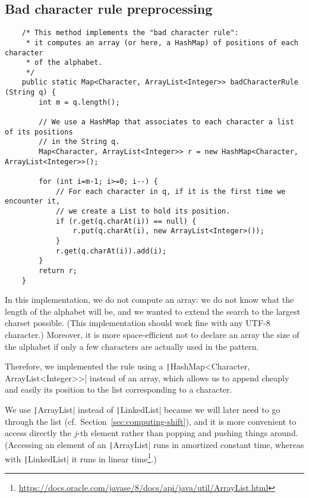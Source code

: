 \documentclass[a4paper,11pt,openany,extrafontsizes,twoside,article]{memoir}
\begin{document}
\subsection{Bad character rule preprocessing}
\label{sec:bad-character-rule-1}

\begin{verbatim}
    /* This method implements the "bad character rule":
     * it computes an array (or here, a HashMap) of positions of each character
     * of the alphabet.
     */
    public static Map<Character, ArrayList<Integer>> badCharacterRule (String q) {
        int m = q.length();

        // We use a HashMap that associates to each character a list of its positions
        // in the String q.
        Map<Character, ArrayList<Integer>> r = new HashMap<Character, ArrayList<Integer>>();

        for (int i=m-1; i>=0; i--) {
            // For each character in q, if it is the first time we encounter it,
            // we create a List to hold its position.
            if (r.get(q.charAt(i)) == null) {
                r.put(q.charAt(i), new ArrayList<Integer>());
            }
            r.get(q.charAt(i)).add(i);
        }
        return r;
    }
\end{verbatim}

In this implementation, we do not compute an array: we do not know
what the length of the alphabet will be, and we wanted to extend the
search to the largest charset possible. (This implementation should
work fine with any UTF-8 character.) Moreover, it is more
space-efficient not to declare an array the size of the alphabet if
only a few characters are actually used in the pattern.

Therefore, we implemented the rule using a
\texttt|HashMap<Character, ArrayList<Integer>>| instead of
an array, which allows us to append cheaply and easily its position to
the list corresponding to a character.

We use \texttt|ArrayList| instead of
\texttt|LinkedList| because we will later need to go through
the list (cf.~Section~\ref{sec:computing-shift}), and it is more
convenient to access directly the $j$-th element rather than popping
and pushing things around. (Accessing an element of an
\texttt|ArrayList| runs in amortized constant time, whereas
with \texttt|LinkedList| it runs in linear
time\footnote{\url{https://docs.oracle.com/javase/8/docs/api/java/util/ArrayList.html}}.)
\end{document}
